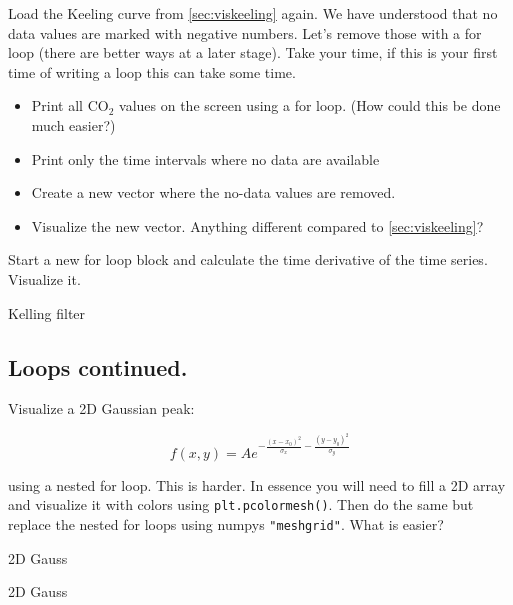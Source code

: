 Load the Keeling curve from \ref{sec:viskeeling} again. We have understood that no data values are marked with negative numbers. Let's remove those with a for loop (there are better ways at a later stage). Take your time, if this is your first time of writing a loop this can take some time.

\begin{itemize}
  \item Print all CO$_2$ values on the screen using a for loop. (How could this be done much easier?)
  \item Print only the time intervals where no data are available
  \item Create a new vector where the no-data values are removed.
  \item Visualize the new vector. Anything different compared to \ref{sec:viskeeling}?
\end{itemize}

Start a new for loop block and calculate the time derivative of the time series. Visualize it. 

\ifanswers
\begin{tcolorbox}[enhanced jigsaw,breakable,pad at break*=1mm,
  colback=blue!5!white,colframe=babyblueeyes,title=Solutions,
  watermark color=white]
  Kelling filter
  
\end{tcolorbox}
\fi

\subsection{Loops continued.}
Visualize a 2D Gaussian peak:

$$
f(x,y) = Ae^{-\frac{(x-x_0)^2}{\sigma_x}-\frac{(y-y_0)^2}{\sigma_y}}
$$

using a nested for loop. This is harder. In essence you will need to fill a 2D array and visualize it with colors using \verb|plt.pcolormesh()|. Then do the same but replace the nested for loops using numpys \verb|"meshgrid"|. What is easier?

\ifanswers
\begin{tcolorbox}[enhanced jigsaw,breakable,pad at break*=1mm,
  colback=blue!5!white,colframe=babyblueeyes,title=Solutions,
  watermark color=white]
  2D Gauss
  
\end{tcolorbox}
\fi

\ifanswers
\begin{tcolorbox}[enhanced jigsaw,breakable,pad at break*=1mm,
  colback=blue!5!white,colframe=babyblueeyes,title=Solutions,
  watermark color=white]
  2D Gauss
  
\end{tcolorbox}
\fi
